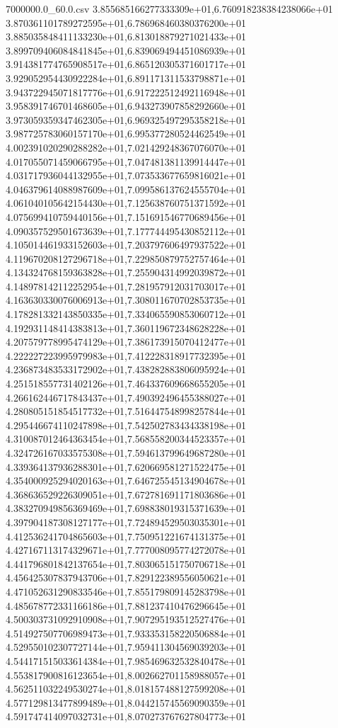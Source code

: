 \begin{filecontents*}{7000000.0_60.0.csv}
3.855685166277333309e+01,6.760918238384238066e+01
3.870361101789272595e+01,6.786968460380376200e+01
3.885035848411133230e+01,6.813018879271021433e+01
3.899709406084841845e+01,6.839069494451086939e+01
3.914381774765908517e+01,6.865120305371601717e+01
3.929052954430922284e+01,6.891171311533798871e+01
3.943722945071817776e+01,6.917222512492116948e+01
3.958391746701468605e+01,6.943273907858292660e+01
3.973059359347462305e+01,6.969325497295358218e+01
3.987725783060157170e+01,6.995377280524462549e+01
4.002391020290288282e+01,7.021429248367076070e+01
4.017055071459066795e+01,7.047481381139914447e+01
4.031717936044132955e+01,7.073533677659816021e+01
4.046379614088987609e+01,7.099586137624555704e+01
4.061040105642154430e+01,7.125638760751371592e+01
4.075699410759440156e+01,7.151691546770689456e+01
4.090357529501673639e+01,7.177744495430852112e+01
4.105014461933152603e+01,7.203797606497937522e+01
4.119670208127296718e+01,7.229850879752757464e+01
4.134324768159363828e+01,7.255904314992039872e+01
4.148978142112252954e+01,7.281957912031703017e+01
4.163630330076006913e+01,7.308011670702853735e+01
4.178281332143850335e+01,7.334065590853060712e+01
4.192931148414383813e+01,7.360119672348628228e+01
4.207579778995474129e+01,7.386173915070412477e+01
4.222227223995979983e+01,7.412228318917732395e+01
4.236873483533172902e+01,7.438282883806095924e+01
4.251518557731402126e+01,7.464337609668655205e+01
4.266162446717843437e+01,7.490392496455388027e+01
4.280805151854517732e+01,7.516447548998257844e+01
4.295446674110247898e+01,7.542502783434338198e+01
4.310087012464363454e+01,7.568558200344523357e+01
4.324726167033575308e+01,7.594613799649687280e+01
4.339364137936288301e+01,7.620669581271522475e+01
4.354000925294020163e+01,7.646725545134904678e+01
4.368636529226309051e+01,7.672781691171803686e+01
4.383270949856369469e+01,7.698838019315371639e+01
4.397904187308127177e+01,7.724894529503035301e+01
4.412536241704865603e+01,7.750951221674131375e+01
4.427167113174329671e+01,7.777008095774272078e+01
4.441796801842137654e+01,7.803065151750706718e+01
4.456425307837943706e+01,7.829122389556050621e+01
4.471052631290833546e+01,7.855179809145283798e+01
4.485678772331166186e+01,7.881237410476296645e+01
4.500303731092910908e+01,7.907295193512527476e+01
4.514927507706989473e+01,7.933353158220506884e+01
4.529550102307727144e+01,7.959411304569039203e+01
4.544171515033614384e+01,7.985469632532840478e+01
4.553817900816123654e+01,8.002662701158988057e+01
4.562511032249530274e+01,8.018157488127599208e+01
4.577129813477899489e+01,8.044215745569090359e+01
4.591747414097032731e+01,8.070273767627804773e+01

\end{filecontents*}
